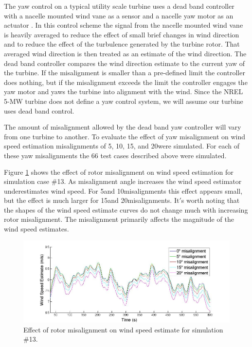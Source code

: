 The yaw control on a typical utility scale turbine uses a dead band controller with a nacelle mounted wind vane as a sensor and a nacelle yaw motor as an actuator \cite{burton2011}. In this control scheme the signal from the nacelle mounted wind vane is heavily averaged to reduce the effect of small brief changes in wind direction and to reduce the effect of the turbulence generated by the turbine rotor. That averaged wind direction is then treated as an estimate of the wind direction. The dead band controller compares the wind direction estimate to the current yaw of the turbine. If the misalignment is smaller than a pre-defined limit the controller does nothing, but if the misalignment exceeds the limit the controller engages the yaw motor and yaws the turbine into alignment with the wind. Since the NREL 5-MW turbine does not define a yaw control system, we will assume our turbine uses dead band control.

The amount of misalignment allowed by the dead band yaw controller will vary from one turbine to another. To evaluate the effect of yaw misalignment on wind speed estimation misalignments of 5\degree, 10\degree, 15\degree, and 20\degree were simulated. For each of these yaw misalignments the 66 test cases described above were simulated.

Figure \ref{fig2-20} shows the effect of rotor misalignment on wind speed estimation for simulation case \#13. As misalignment angle increases the wind speed estimator underestimates wind speed. For 5\degree and 10\degree misalignments this effect appears small, but the effect is much larger for 15\degree and 20\degree misalignments. It$'$s worth noting that the shapes of the wind speed estimate curves do not change much with increasing rotor misalignment. The misalignment primarily affects the magnitude of the wind speed estimates. 


\begin{figure}[htbp]
	\centering
		\includegraphics[width = \linewidth]{Figures/ch2Figures/fig2-20.jpg}
		
	\caption{Effect of rotor misalignment on wind speed estimate for simulation \#13.}
	\label{fig2-20}
\end{figure}

